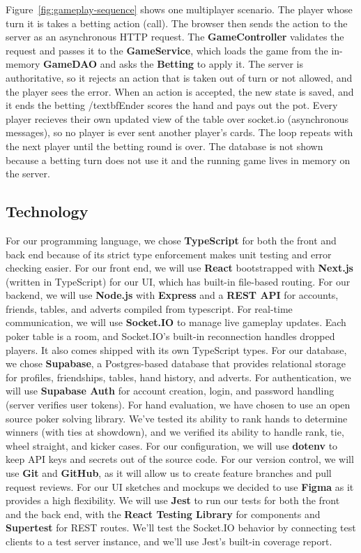 \documentclass{article}
\begin{document}
Figure~\ref{fig:gameplay-sequence} shows one multiplayer scenario. The player whose turn it is takes a betting action (call). The browser then sends the action to the server as an asynchronous HTTP request. The \textbf{GameController} validates the request and passes it to the \textbf{GameService}, which loads the game from the in-memory \textbf{GameDAO} and asks the \textbf{Betting} to apply it. The server is authoritative, so it rejects an action that is taken out of turn or not allowed, and the player sees the error. When an action is accepted, the new state is saved, and it ends the betting /textbf{Ender} scores the hand and pays out the pot. Every player recieves their own updated view of the table over socket.io (asynchronous messages), so no player is ever sent another player's cards. The loop repeats with the next player until the betting round is over. The database is not shown because a betting turn does not use it and the running game lives in memory on the server.
 
\subsection{Technology}
For our programming language, we chose \textbf{TypeScript} for both the front and back end because of its strict type enforcement makes unit testing and error checking easier. For our front end, we will use \textbf{React} bootstrapped with \textbf{Next.js} (written in TypeScript) for our UI, which has built-in file-based routing. For our backend, we will use \textbf{Node.js} with \textbf{Express} and a \textbf{REST API} for accounts, friends, tables, and adverts compiled from typescript. 
For real-time communication, we will use \textbf{Socket.IO} to manage live gameplay updates. Each poker table is a room, and Socket.IO’s built-in reconnection handles dropped players. It also comes shipped with its own TypeScript types. 
For our database, we chose \textbf{Supabase}, a Postgres-based database that provides relational storage for profiles, friendships, tables, hand history, and adverts. For authentication, we will use \textbf{Supabase Auth} for account creation, login, and password handling (server verifies user tokens).
For hand evaluation, we have chosen to use an open source poker solving library. We’ve tested its ability to rank hands to determine winners (with ties at showdown), and we verified its ability to handle rank, tie, wheel straight, and kicker cases.
For our configuration, we will use \textbf{dotenv} to keep API keys and secrets out of the source code. For our version control, we will use \textbf{Git} and \textbf{GitHub}, as it will allow us to create feature branches and pull request reviews.
For our UI sketches and mockups we decided to use \textbf{Figma} as it provides a high flexibility.
We will use \textbf{Jest} to run our tests for both the front and the back end, with the \textbf{React Testing Library} for components and \textbf{Supertest} for REST routes. We’ll test the Socket.IO behavior by connecting test clients to a test server instance, and we’ll use Jest’s built-in coverage report. 
\end{document}
